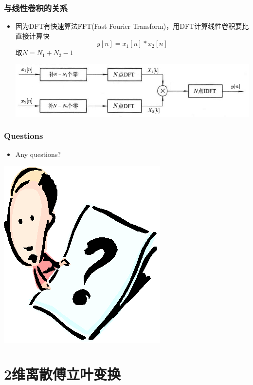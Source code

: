 \documentclass[CJKutf8,dvipsnames,table]{beamer}
\begin{document}
\begin{CJK*}{UTF8}{song}
\begin{frame}
\begin{itemize}
	\end{itemize}
  \end{frame} 

  \begin{frame}
    \frametitle{与线性卷积的关系}
    \begin{itemize}
    \item 因为DFT有快速算法FFT(Fast Fourier Transform)，用DFT计算线性卷积要比直接计算快
	\[
		y[n] = x_1[n] \ast x_2[n]
	\]
	取$N=N_1+N_2-1$
    \begin{center}
      \includegraphics[scale=.37]{gxq-dsp-f3-4-1}
    \end{center}
	\end{itemize}
  \end{frame}   
  
  \begin{frame}
    \frametitle{Questions}
    \begin{itemize}
    \item Any questions?
    \end{itemize}
    \begin{center}
      \includegraphics[scale=.5]{question}
    \end{center}
  \end{frame}  
  
  \section{2维离散傅立叶变换}


\end{CJK*}
\end{document}
